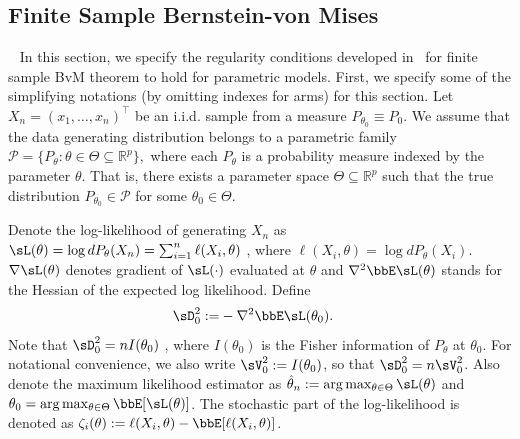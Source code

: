 \documentclass[11pt]{article}
\begin{document}
\subsection{Finite Sample Bernstein-von Mises}~\label{sec:FBvM}
In this section, we specify the regularity conditions developed in~\cite{Spokoiny2012,Panov2015} for finite sample  BvM theorem to hold for parametric models. %
 First, we specify some of the simplifying notations (by omitting indexes for arms) for this section. Let \( X_n = (x_{1},\ldots,x_{n})^\top \) be an i.i.d. sample from a measure \( P_{\theta_0} \equiv P_0\). We assume that the data generating distribution belongs to a parametric family 
\(
\mathcal{P} = \{ P_\theta : \theta \in \Theta \subseteq \mathbb{R}^p \},
\)
where each $P_\theta$ is a probability measure indexed by the parameter $\theta$. That is, there exists a parameter space $\Theta \subseteq \mathbb{R}^p$ such that the true distribution $P_{\theta_0} \in \mathcal{P}$ for some $\theta_0 \in \Theta$.
 
 Denote the log-likelihood of generating $X_n$ as $\sL(\theta) = \log dP_{\theta}(X_n)  = \sum_{i=1}^{n} \ell(X_i,\theta)$ , where $\ell(X_i,\theta)=\log dP_{\theta}(X_i)$. $\nabla \sL(\theta)$ denotes gradient of $\sL(\cdot)$ evaluated at $\theta$ and $\nabla^2\bbE\sL(\theta)$ stands for the Hessian of the expected log likelihood.  Define 
 \begin{align}
    \label{eq:fisherFullparam}
    \sD_0^{2}
     := &
    - \nabla^{2} \bbE \sL(\theta_0) .
 \end{align}
Note that $\sD_0^{2} = nI(\theta_0)$ , where $I(\theta_0)$ is the Fisher information of $P_{\theta}$ at $\theta_0$. For notational convenience, we also write $\sV_0^2 := I(\theta_0)$, so that $\sD_0^{2} = n \sV_0^2$.
Also denote the maximum likelihood estimator as $\hat{\theta}_n := \arg\max_{\theta \in \Theta} \sL(\theta)$ and $\theta_0 = \arg\max_{\theta \in \Theta} \bbE[\sL(\theta)]$. The stochastic part of the log-likelihood is denoted as $\zeta_i (\theta):= \ell(X_i,\theta) - \bbE[\ell(X_i,\theta)]$.
\end{document}
